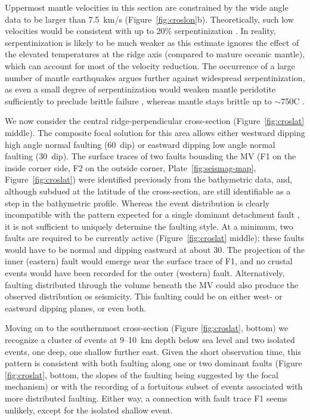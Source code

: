 \documentclass[aguplus]{aguplus}
\renewcommand{\chg}[1]{{\textcolor{blue}{\sf #1}}}
\renewcommand{\del}[1]{{\textcolor{red}{\sout{#1}}}}
\newlength{\tw}
\begin{document}
\begin{article}
Uppermost mantle velocities in this section are constrained by the
 wide angle data to be larger than 7.5~km/s
(Figure~\ref{fig:croslon}b). Theoretically, such low velocities would be
consistent with up to 20\% serpentinization
\citep{oreilly96,christensen66}.  In reality, serpentinization is
likely to be much weaker as this estimate ignores the
effect of the elevated temperatures at the ridge axis (compared to
mature oceanic mantle), which can account for most of the velocity
reduction. The occurrence of a large number of mantle earthquakes
argues further against widespread serpentinization, as even a small
degree of serpentinization would weaken mantle peridotite sufficiently
to preclude brittle failure \citep{escartin97a}, whereas mantle stays brittle up to
$\sim$750\dg C \citep{wiens83}.

We now consider the
central ridge-perpendicular cross-section
(Figure~\ref{fig:croslat} middle).    The composite focal solution for this area
allows either westward dipping high angle normal faulting (60\dg\ dip)
or eastward dipping low angle normal faulting (30\dg\ dip).
The surface traces of two faults bounding the MV (F1 on the inside corner side,
F2 on the outside corner, Plate~\ref{fig:seismag-map},
Figure~\ref{fig:croslat}) were identified previously
from the bathymetric data, and, although subdued at the latitude of the
cross-section, are still identifiable as a step in the bathymetric
profile. Whereas the event distribution is
clearly incompatible with the pattern expected for a single dominant
detachment fault \citep[e.g.][]{tucholke94}, it is not sufficient to
uniquely determine the faulting style. At a minimum, two faults
 are required to be currently active (Figure~\ref{fig:croslat} middle); these
faults would have to be normal and dipping eastward at about
30\dg. The projection of the inner (eastern) fault would emerge near the
surface trace of F1, and no crustal events would have been recorded
for the outer (western) fault.   Alternatively, faulting distributed
through the volume beneath the MV could also produce the observed
distribution os seismicity.  This faulting could be on either west- or
eastward dipping planes, or even both.





Moving on to the southernmost cross-section (Figure \ref{fig:croslat}, bottom)
we recognize a cluster of events at 9--10~km depth below
sea level and two isolated
events, one deep, one shallow further east.  Given the short
observation time, this pattern is consistent with both faulting along
one or two dominant faults (Figure \ref{fig:croslat}, bottom, the
slopes of the faulting being suggested by the focal mechanism) or
with the recording of a fortuitous subset of events associated with more distributed faulting.
  Either way, a connection with fault
trace F1
seems unlikely, except for the isolated shallow event.


\end{article}
\end{document}

